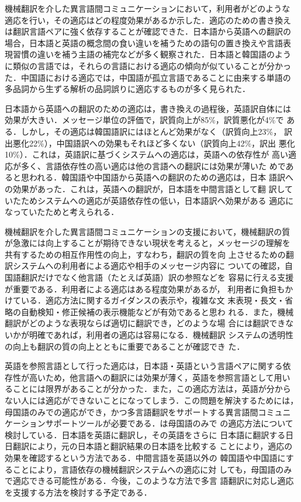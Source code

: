 機械翻訳を介した異言語間コミュニケーションにおいて，利用者がどのような
適応を行い，その適応はどの程度効果があるか示した．適応のための書き換え
は翻訳言語ペアに強く依存することが確認できた．日本語から英語への翻訳の
場合，日本語と英語の概念間の食い違いを補うための語句の置き換えや言語表
現習慣の違いを補う主語の補完などが多く観察された．日本語と韓国語のよう
に類似の言語では，それらの言語における適応の傾向が似ていることが分かっ
た．中国語における適応では，中国語が孤立言語であることに由来する単語の
多品詞から生ずる解析の品詞誤りに適応するものが多く見られた．

日本語から英語への翻訳のための適応は，書き換えの過程後，英語訳自体には
効果が大きい．メッセージ単位の評価で，訳質向上が85\%，訳質悪化が4\%で
ある．しかし，その適応は韓国語訳にはほとんど効果がなく（訳質向上23\%，
訳出悪化22\%），中国語訳への効果もそれほど多くない（訳質向上42\%，訳出
悪化10\%）．これは，英語訳に基づくシステムへの適応は，英語への依存性が
高い適応が多く、言語依存性の高い適応は他の言語への翻訳には効果が薄いた
めであると思われる．韓国語や中国語から英語への翻訳のための適応は，日本
語訳への効果があった．これは，英語への翻訳が，日本語を中間言語として翻
訳していたためシステムへの適応が英語依存性の低い，日本語訳へ効果がある
適応になっていたためと考えられる．

機械翻訳を介した異言語間コミュニケーションの支援において，機械翻訳の質
が急激には向上することが期待できない現状を考えると，メッセージの理解を
共有するための相互作用性の向上\cite{石田:2003}，すなわち，翻訳の質を向
上させるための翻訳システムへの利用者による適応や相手のメッセージ内容に
ついての確認，自国語翻訳だけでなく他言語（たとえば英語）訳の参照などを
容易に行える支援が重要である．利用者による適応はある程度効果があるが，
利用者に負担もかけている．適応方法に関するガイダンスの表示や，複雑な文
末表現・長文・省略の自動検知・修正候補の表示機能などが有効であると思わ
れる．また，機械翻訳がどのような表現ならば適切に翻訳でき，どのような場
合には翻訳できないかが明確であれば，利用者の適応は容易になる．機械翻訳
システムの透明性の向上も翻訳の質の向上とともに重要であることが確認でき
た．

英語を参照言語として行った適応は，日本語・英語という言語ペアに関する依
存性が高いため，他言語への翻訳には効果が薄く，英語を参照言語として用い
ることには限界があることが分かった．また，この適応方法は，英語が分から
ない人には適応ができないことになってしまう．この問題を解決するためには，
母国語のみでの適応ができ，かつ多言語翻訳をサポートする異言語間コミュニ
ケーションサポートツールが必要である．は母国語のみで
の適応方法について検討している．日本語を英語に翻訳し，その英語をさらに
日本語に翻訳する日日翻訳により，元の日本語と翻訳結果の日本語を比較する
ことにより，適応の効果を確認するという方法である．中間言語を英語以外の
韓国語や中国語にすることにより，言語依存の機械翻訳システムへの適応に対
しても，母国語のみで適応できる可能性がある．今後，このような方法で多言
語翻訳に対応し適応を支援する方法を検討する予定である．


